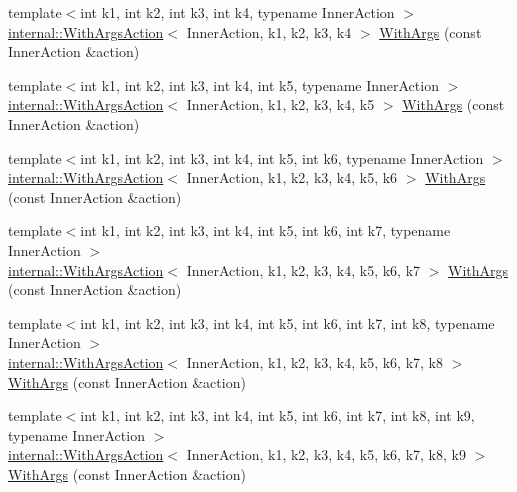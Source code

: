 \begin{DoxyCompactItemize}
\item 
{\footnotesize template$<$int k1, int k2, int k3, int k4, typename Inner\+Action $>$ }\\\hyperlink{classtesting_1_1internal_1_1_with_args_action}{internal\+::\+With\+Args\+Action}$<$ Inner\+Action, k1, k2, k3, k4 $>$ \hyperlink{namespacetesting_a646a2e4ac7866ee8c486cb167ba9b45e}{With\+Args} (const Inner\+Action \&action)
\item 
{\footnotesize template$<$int k1, int k2, int k3, int k4, int k5, typename Inner\+Action $>$ }\\\hyperlink{classtesting_1_1internal_1_1_with_args_action}{internal\+::\+With\+Args\+Action}$<$ Inner\+Action, k1, k2, k3, k4, k5 $>$ \hyperlink{namespacetesting_aa36b0c7216df96bdacf9fe491afd40bd}{With\+Args} (const Inner\+Action \&action)
\item 
{\footnotesize template$<$int k1, int k2, int k3, int k4, int k5, int k6, typename Inner\+Action $>$ }\\\hyperlink{classtesting_1_1internal_1_1_with_args_action}{internal\+::\+With\+Args\+Action}$<$ Inner\+Action, k1, k2, k3, k4, k5, k6 $>$ \hyperlink{namespacetesting_a6df9cd27659e5943b5d3d77fc4f102e3}{With\+Args} (const Inner\+Action \&action)
\item 
{\footnotesize template$<$int k1, int k2, int k3, int k4, int k5, int k6, int k7, typename Inner\+Action $>$ }\\\hyperlink{classtesting_1_1internal_1_1_with_args_action}{internal\+::\+With\+Args\+Action}$<$ Inner\+Action, k1, k2, k3, k4, k5, k6, k7 $>$ \hyperlink{namespacetesting_a04146a27847141c6942e9c67a85aadbe}{With\+Args} (const Inner\+Action \&action)
\item 
{\footnotesize template$<$int k1, int k2, int k3, int k4, int k5, int k6, int k7, int k8, typename Inner\+Action $>$ }\\\hyperlink{classtesting_1_1internal_1_1_with_args_action}{internal\+::\+With\+Args\+Action}$<$ Inner\+Action, k1, k2, k3, k4, k5, k6, k7, k8 $>$ \hyperlink{namespacetesting_a16c131c0d58ae07d2e1ee6c7a44aaad1}{With\+Args} (const Inner\+Action \&action)
\item 
{\footnotesize template$<$int k1, int k2, int k3, int k4, int k5, int k6, int k7, int k8, int k9, typename Inner\+Action $>$ }\\\hyperlink{classtesting_1_1internal_1_1_with_args_action}{internal\+::\+With\+Args\+Action}$<$ Inner\+Action, k1, k2, k3, k4, k5, k6, k7, k8, k9 $>$ \hyperlink{namespacetesting_a6aec78e6c201b150c78271e3f851414e}{With\+Args} (const Inner\+Action \&action)

\end{DoxyCompactItemize}
